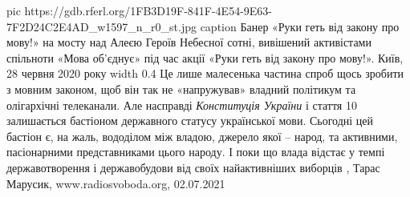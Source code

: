 \ifcmt
  pic https://gdb.rferl.org/1FB3D19F-841F-4E54-9E63-7F2D24C2E4AD_w1597_n_r0_st.jpg
	caption Банер «Руки геть від закону про мову!» на мосту над Алеєю Героїв Небесної сотні, вивішений активістами спільноти «Мова об’єднує» під час акції «Руки геть від закону про мову!». Київ, 28 червня 2020 року
	width 0.4
\fi
Це лише малесенька частина спроб щось зробити з мовним законом, щоб він так не
«напружував» владний політикум та олігархічні телеканали. Але насправді
\emph{Конституція України} і стаття 10 залишається бастіоном державного статусу
української мови. Сьогодні цей бастіон є, на жаль, вододілом між владою,
джерело якої – народ, та активними, пасіонарними представниками цього народу. І
поки що влада відстає у темпі державотворення і державобудови від своїх
найактивніших виборців
, 
Тарас Марусик, www.radiosvoboda.org, 02.07.2021
